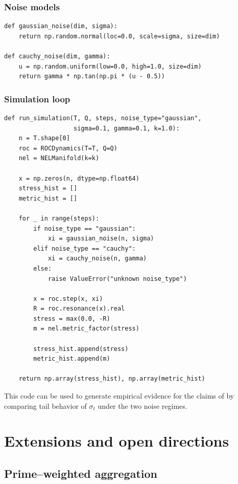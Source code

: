 \documentclass[11pt]{article}
\theoremstyle{plain}
\theoremstyle{definition}
\numberwithin{equation}{section}
\begin{document}
\subsubsection*{Noise models}

\begin{lstlisting}[style=python,caption={Gaussian and Cauchy noise}]
def gaussian_noise(dim, sigma):
    return np.random.normal(loc=0.0, scale=sigma, size=dim)

def cauchy_noise(dim, gamma):
    u = np.random.uniform(low=0.0, high=1.0, size=dim)
    return gamma * np.tan(np.pi * (u - 0.5))
\end{lstlisting}

\subsubsection*{Simulation loop}

\begin{lstlisting}[style=python,caption={Gaussian vs Cauchy simulation}]
def run_simulation(T, Q, steps, noise_type="gaussian",
                   sigma=0.1, gamma=0.1, k=1.0):
    n = T.shape[0]
    roc = ROCDynamics(T=T, Q=Q)
    nel = NELManifold(k=k)

    x = np.zeros(n, dtype=np.float64)
    stress_hist = []
    metric_hist = []

    for _ in range(steps):
        if noise_type == "gaussian":
            xi = gaussian_noise(n, sigma)
        elif noise_type == "cauchy":
            xi = cauchy_noise(n, gamma)
        else:
            raise ValueError("unknown noise_type")

        x = roc.step(x, xi)
        R = roc.resonance(x).real
        stress = max(0.0, -R)
        m = nel.metric_factor(stress)

        stress_hist.append(stress)
        metric_hist.append(m)

    return np.array(stress_hist), np.array(metric_hist)
\end{lstlisting}

This code can be used to generate empirical evidence for the claims of
 by comparing tail behavior of
$\sigma_t$ under the two noise regimes.

\section{Extensions and open directions}

\subsection{Prime--weighted aggregation}
\end{document}
